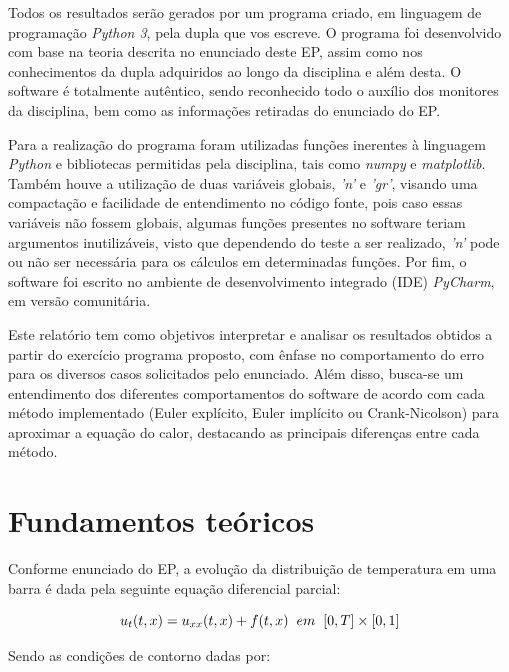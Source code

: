 \documentclass[a4paper, 12pt]{article}
\begin{document}
Todos os resultados serão gerados por um programa criado, em linguagem de programação \textit{Python 3}, pela dupla que vos escreve. O programa foi desenvolvido com base na teoria descrita no enunciado deste EP, assim como nos conhecimentos da dupla adquiridos ao longo da disciplina e além desta. O software é totalmente autêntico, sendo reconhecido todo o auxílio dos monitores da disciplina, bem como as informações retiradas do enunciado do EP. 

Para a realização do programa foram utilizadas funções inerentes à linguagem \textit{Python} e bibliotecas permitidas pela disciplina, tais como \textit{numpy} e \textit{matplotlib}. Também houve a utilização de duas variáveis globais, \textit{'n'} e \textit{'gr'}, visando uma compactação e facilidade de entendimento no código fonte, pois caso essas variáveis não fossem globais, algumas funções presentes no software teriam argumentos inutilizáveis, visto que dependendo do teste a ser realizado, \textit{'n'} pode ou não ser necessária para os cálculos em determinadas funções. Por fim, o software foi escrito no ambiente de desenvolvimento integrado (IDE) \textit{PyCharm}, em versão comunitária. 

Este relatório tem como objetivos interpretar e analisar os resultados obtidos a partir do exercício programa proposto, com ênfase no comportamento do erro para os diversos casos solicitados pelo enunciado. Além disso, busca-se um entendimento dos diferentes comportamentos do software de acordo com cada método implementado (Euler explícito, Euler implícito ou Crank-Nicolson) para aproximar a equação do calor, destacando as principais diferenças entre cada método.




\section{Fundamentos teóricos}

Conforme enunciado do EP, a evolução da distribuição de temperatura em uma barra é dada pela seguinte equação diferencial parcial:

\begin{equation}u_{t}(t,x)=u_{xx}(t,x)+f(t,x) \hspace{0.2cm}em\hspace{0.2cm} [0,T] \times [0,1]\end{equation}

Sendo as condições de contorno dadas por:
\end{document}
